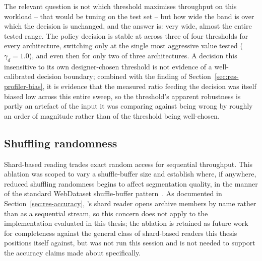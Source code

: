 The relevant question is not which threshold maximises throughput on this
workload -- that would be tuning on the test set -- but how wide the band is
over which the decision is unchanged, and the answer is: very wide, almost the
entire tested range. The policy decision is stable at  across three
of four thresholds for every architecture, switching only at the single most
aggressive value tested ($\gamma_d=1.0$), and even then for only two of three
architectures. A decision this insensitive to its own designer-chosen threshold
is not evidence of a well-calibrated decision boundary; combined with the finding
of Section~\ref{sec:res-profiler-bias}, it is evidence that the measured ratio
feeding the decision was itself biased low across this entire sweep, so the
threshold's apparent robustness is partly an artefact of the input it was
comparing against being wrong by roughly an order of magnitude rather than of the
threshold being well-chosen.

\subsection{Shuffling randomness}
\label{sec:ablation-shuffle}

Shard-based reading trades exact random access for sequential throughput. This
ablation was scoped to vary a shuffle-buffer size and establish where, if
anywhere, reduced shuffling randomness begins to affect segmentation quality, in
the manner of the standard WebDataset shuffle-buffer pattern~\cite{Aizman19}.
As documented in Section~\ref{sec:res-accuracy}, \pads{}'s shard reader opens
archive members by name rather than as a sequential stream, so this concern does
not apply to the implementation evaluated in this thesis; the ablation is
retained as future work for completeness against the general class of
shard-based readers this thesis positions itself against, but was not run this
session and is not needed to support the accuracy claims made about \pads{}
specifically.
